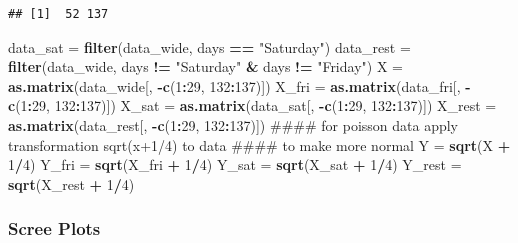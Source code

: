 \documentclass[]{article}
\newenvironment{Shaded}{\begin{snugshade}}{\end{snugshade}}
\newcommand{\KeywordTok}[1]{\textcolor[rgb]{0.13,0.29,0.53}{\textbf{#1}}}
\newcommand{\DecValTok}[1]{\textcolor[rgb]{0.00,0.00,0.81}{#1}}
\newcommand{\StringTok}[1]{\textcolor[rgb]{0.31,0.60,0.02}{#1}}
\newcommand{\OperatorTok}[1]{\textcolor[rgb]{0.81,0.36,0.00}{\textbf{#1}}}
\newcommand{\NormalTok}[1]{#1}
\begin{document}
\begin{verbatim}
## [1]  52 137
\end{verbatim}

\begin{Shaded}
\begin{Highlighting}[]
\NormalTok{data_sat =}\StringTok{ }\KeywordTok{filter}\NormalTok{(data_wide, days }\OperatorTok{==}\StringTok{ "Saturday"}\NormalTok{)}
\NormalTok{data_rest =}\StringTok{ }\KeywordTok{filter}\NormalTok{(data_wide, days }\OperatorTok{!=}\StringTok{ "Saturday"} \OperatorTok{&}\StringTok{ }\NormalTok{days }\OperatorTok{!=}\StringTok{ "Friday"}\NormalTok{)}
\NormalTok{X =}\StringTok{ }\KeywordTok{as.matrix}\NormalTok{(data_wide[, }\OperatorTok{-}\KeywordTok{c}\NormalTok{(}\DecValTok{1}\OperatorTok{:}\DecValTok{29}\NormalTok{, }\DecValTok{132}\OperatorTok{:}\DecValTok{137}\NormalTok{)])}
\NormalTok{X_fri =}\StringTok{ }\KeywordTok{as.matrix}\NormalTok{(data_fri[, }\OperatorTok{-}\KeywordTok{c}\NormalTok{(}\DecValTok{1}\OperatorTok{:}\DecValTok{29}\NormalTok{, }\DecValTok{132}\OperatorTok{:}\DecValTok{137}\NormalTok{)])}
\NormalTok{X_sat =}\StringTok{ }\KeywordTok{as.matrix}\NormalTok{(data_sat[, }\OperatorTok{-}\KeywordTok{c}\NormalTok{(}\DecValTok{1}\OperatorTok{:}\DecValTok{29}\NormalTok{, }\DecValTok{132}\OperatorTok{:}\DecValTok{137}\NormalTok{)])}
\NormalTok{X_rest =}\StringTok{ }\KeywordTok{as.matrix}\NormalTok{(data_rest[, }\OperatorTok{-}\KeywordTok{c}\NormalTok{(}\DecValTok{1}\OperatorTok{:}\DecValTok{29}\NormalTok{, }\DecValTok{132}\OperatorTok{:}\DecValTok{137}\NormalTok{)])}
\NormalTok{#### for poisson data apply transformation sqrt(x+1/4) to data}
\NormalTok{#### to make more normal}
\NormalTok{Y =}\StringTok{ }\KeywordTok{sqrt}\NormalTok{(X }\OperatorTok{+}\StringTok{ }\DecValTok{1}\OperatorTok{/}\DecValTok{4}\NormalTok{)}
\NormalTok{Y_fri =}\StringTok{ }\KeywordTok{sqrt}\NormalTok{(X_fri }\OperatorTok{+}\StringTok{ }\DecValTok{1}\OperatorTok{/}\DecValTok{4}\NormalTok{)}
\NormalTok{Y_sat =}\StringTok{ }\KeywordTok{sqrt}\NormalTok{(X_sat }\OperatorTok{+}\StringTok{ }\DecValTok{1}\OperatorTok{/}\DecValTok{4}\NormalTok{)}
\NormalTok{Y_rest =}\StringTok{ }\KeywordTok{sqrt}\NormalTok{(X_rest }\OperatorTok{+}\StringTok{ }\DecValTok{1}\OperatorTok{/}\DecValTok{4}\NormalTok{)}
\end{Highlighting}
\end{Shaded}

\subsubsection{Scree Plots}\label{scree-plots}
\end{document}
